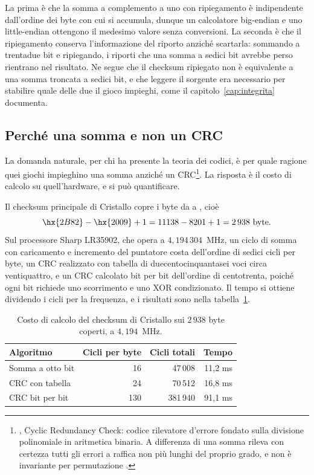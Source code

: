 La prima è che la somma a complemento a uno con ripiegamento è indipendente dall'ordine dei byte con cui si accumula, dunque un calcolatore big-endian e uno little-endian ottengono il medesimo valore senza conversioni. La seconda è che il ripiegamento conserva l'informazione del riporto anziché scartarla: sommando a trentadue bit e ripiegando, i riporti che una somma a sedici bit avrebbe perso rientrano nel risultato. Ne segue che il checksum ripiegato non è equivalente a una somma troncata a sedici bit, e che leggere il sorgente era necessario per stabilire quale delle due il gioco impieghi, come il capitolo~\ref{cap:integrita} documenta.

\subsection{Perché una somma e non un CRC}

La domanda naturale, per chi ha presente la teoria dei codici, è per quale ragione quei giochi impieghino una somma anziché un CRC\footnote{, Cyclic Redundancy Check: codice rilevatore d'errore fondato sulla divisione polinomiale in aritmetica binaria. A differenza di una somma rileva con certezza tutti gli errori a raffica non più lunghi del proprio grado, e non è invariante per permutazione \cite{peterson-brown}.}. La risposta è il costo di calcolo su quell'hardware, e si può quantificare.

Il checksum principale di Cristallo copre i byte da  a , cioè
\[
\hx{2B82} - \hx{2009} + 1 = 11138 - 8201 + 1 = 2\,938 \text{ byte}.
\]
Sul processore Sharp LR35902, che opera a $4{,}194\,304$~MHz, un ciclo di somma con caricamento e incremento del puntatore costa dell'ordine di sedici cicli per byte, un CRC realizzato con tabella di duecentocinquantasei voci circa ventiquattro, e un CRC calcolato bit per bit dell'ordine di centotrenta, poiché ogni bit richiede uno scorrimento e uno XOR condizionato. Il tempo si ottiene dividendo i cicli per la frequenza, e i risultati sono nella tabella~\ref{tab:crc}.

\begin{table}[htbp]
\centering
\caption{Costo di calcolo del checksum di Cristallo sui $2\,938$ byte coperti, a $4{,}194$~MHz.}\label{tab:crc}
\begin{tabular}{@{}lrrr@{}}
\toprule
Algoritmo & Cicli per byte & Cicli totali & Tempo \\
\midrule
Somma a otto bit & 16 & 47\,008 & 11,2 ms \\
CRC con tabella & 24 & 70\,512 & 16,8 ms \\
CRC bit per bit & 130 & 381\,940 & 91,1 ms \\
\bottomrule
\end{tabular}
\end{table}

